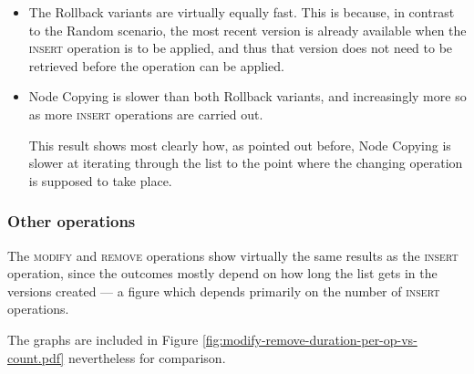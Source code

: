 \begin{itemize}
  
  \item The Rollback variants are virtually equally fast. This is because, in
  contrast to the Random scenario, the most recent version is already available
  when the \textsc{insert} operation is to be applied, and thus that version
  does not need to be retrieved before the operation can be applied.
  
  \item Node Copying is slower than both Rollback variants, and increasingly
  more so as more \textsc{insert} operations are carried out.
  
  This result shows most clearly how, as pointed out before, Node Copying is
  slower at iterating through the list to the point where the changing operation
  is supposed to take place.
\end{itemize}

\subsubsection{Other operations}
The \textsc{modify} and \textsc{remove} operations show virtually the same
results as the \textsc{insert} operation, since the outcomes mostly depend on
how long the list gets in the versions created --- a figure which depends
primarily on the number of \textsc{insert} operations.

The graphs are included in Figure
\ref{fig:modify-remove-duration-per-op-vs-count.pdf} nevertheless for
comparison.

